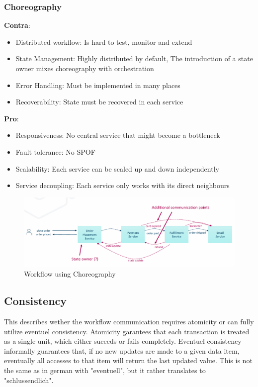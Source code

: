 \documentclass[../Main.tex]{subfiles}
\begin{document}
\subsubsection{Choreography}
\begin{multicols}{2}
    \textbf{Contra}:
    \begin{itemize}
        \item Distributed workflow: Is hard to test, monitor and extend
        \item State Management: Highly distributed by default, The introduction of a state owner mixes choreography with orchestration
        \item Error Handling: Must be implemented in many places
        \item Recoverability: State must be recovered in each service
    \end{itemize}
    \columnbreak
    \textbf{Pro}:
    \begin{itemize}
        \item Responsiveness: No central service that might become a bottleneck
        \item Fault tolerance: No SPOF
        \item Scalability: Each service can be scaled up and down independently
        \item Service decoupling: Each service only works with its direct neighbours
    \end{itemize}
\end{multicols}

\begin{figure}[H]
    \centering
    \includegraphics[width=1\linewidth]{Images/workflow-choreography.png}
    \caption{Workflow using Choreography}
\end{figure}
\newpage

\newpage
\subsection{Consistency}
This describes wether the workflow communication requires atomicity or can fully utilize eventuel consistency.
Atomicity garantees that each transaction is treated as a single unit, which either suceeds or fails completely.
Eventuel consistency informally guarantees that, if no new updates are made to a given data item, eventually all accesses to that item will return the last updated value.
This is not the same as in german with "eventuell", but it rather translates to "schlussendlich".
\end{document}

